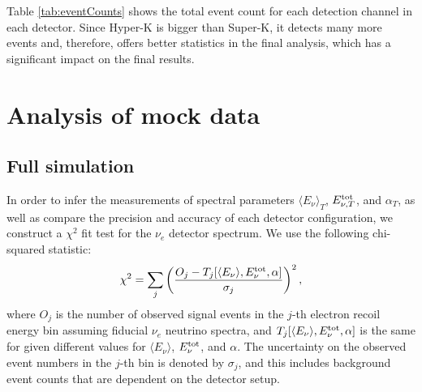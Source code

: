 \documentclass[aps,reprint,superscriptaddress]{revtex4-1}
\begin{document}
Table \ref{tab:eventCounts} shows the total event count for each detection channel in each detector. Since Hyper-K is bigger than Super-K, it detects many more events and, therefore, offers better statistics in the final analysis, which has a significant impact on the final results.

\section{Analysis of mock data} \label{sec:chiSquare}

\subsection{Full simulation}


In order to infer the measurements of spectral parameters $\langle E_{\nu}\rangle_T$, $E_{\nu,T}^{\rm tot}$, and $\alpha_T$, as well as compare the precision and accuracy of each detector configuration, we construct a $\chi^{2}$ fit test for the $\nu_{e}$ detector spectrum. We use the following chi-squared statistic:
\begin{equation} \label{eq:chiSquare}
\chi^{2}=\sum_{j}\bigg(\frac{O_{j}-T_{j}[\langle E_{\nu}\rangle, E_{\nu}^{\rm tot},\alpha]}{\sigma_{j}}\bigg)^{2}\,,
\end{equation}
where $O_{j}$ is the number of observed signal events in the $j$-th electron recoil energy bin assuming fiducial $\nu_e$ neutrino spectra, and $T_{j}[\langle E_{\nu}\rangle, E_{\nu}^{\rm tot},\alpha]$ is the same for given different values for $\langle E_{\nu}\rangle$, $ E_{\nu}^{\rm tot}$, and $\alpha$. The uncertainty on the observed event numbers in the $j$-th bin is denoted by $\sigma_{j}$, and this includes background event counts that are dependent on the detector setup. 
\end{document}
